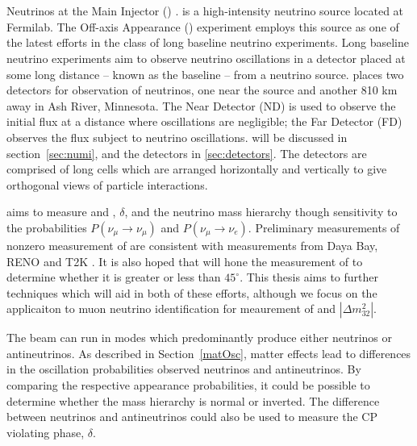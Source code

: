 \chapter{\nova}
\label{nova_chapter}
Neutrinos at the Main Injector (\numi) \cite{adamson2016numi}.
is a high-intensity neutrino source located at Fermilab.  The \numi Off-axis \nue Appearance (\nova) experiment employs this source as one of the latest efforts in the class of long baseline neutrino experiments.  Long baseline neutrino experiments aim to observe neutrino oscillations in a detector placed at some long distance -- known as the baseline -- from a neutrino source.  \nova
places two detectors for observation of neutrinos, one near the source and another 810 km away in Ash River, Minnesota.  The Near Detector (ND) is used to observe the initial  \numi flux at a distance where oscillations are negligible; the Far Detector (FD) observes the \numi flux subject to neutrino oscillations.  \numi will be discussed in section~\ref{sec:numi}, and the \nova detectors in \ref{sec:detectors}.  The detectors are comprised of long cells which are arranged horizontally and vertically to give orthogonal views
of particle interactions.

\nova aims to measure and \thetatth, $\delta$, and the neutrino
mass hierarchy though sensitivity to the probabilities $P(\nu_\mu \rightarrow \nu_\mu)$ and $P(\nu_\mu \rightarrow \nu_e)$.  Preliminary measurements of nonzero measurement of \thetaoth are consistent with measurements from Daya Bay, RENO and T2K \cite{nova2016nue}.  It is also hoped that \nova will  hone the measurement of \thetatth to determine whether it is greater or less than $45^\circ$.  This thesis aims to further techniques which will aid in both of these efforts, although we focus on the applicaiton to muon neutrino identification for meaurement of \thetatth and $|\Delta m^2_{32}|$.

The \numi beam can run in modes which predominantly produce either neutrinos
or antineutrinos.
As described in Section~\ref{matOsc}, matter effects lead to differences
in the oscillation probabilities observed neutrinos and antineutrinos.
By comparing the respective appearance probabilities, it could be possible to determine whether the mass hierarchy is normal or inverted.  The difference between neutrinos and antineutrinos could also be used to measure the CP violating phase, $\delta$.

